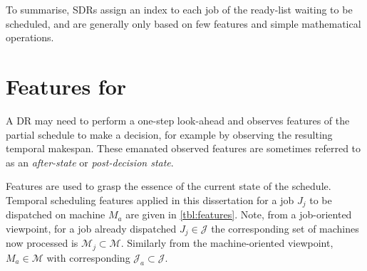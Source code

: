 
To summarise, SDRs assign an index to each job of the ready-list waiting to be scheduled, and are generally only based on few features and simple mathematical operations. 


\section{Features for \jsp}\label{sec:features}
A DR may need to perform a one-step look-ahead and observes features of the partial schedule to make a decision, for example by observing the resulting temporal makespan. These emanated observed features are sometimes referred to as an \emph{after-state} or \emph{post-decision state}. 

Features are used to grasp the essence of the current state of the schedule. Temporal scheduling features applied in this dissertation for a job $J_j$ to be dispatched on machine $M_a$ are given in \cref{tbl:features}. 
Note, from a job-oriented viewpoint, for a job already dispatched $J_j\in\mathcal{J}$ the corresponding set of machines now processed is $\mathcal{M}_j\subset\mathcal{M}$. Similarly from the machine-oriented viewpoint, $M_a\in\mathcal{M}$ with corresponding $\mathcal{J}_a\subset\mathcal{J}$. 

